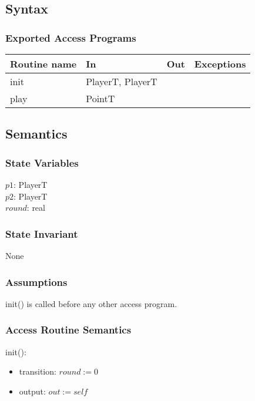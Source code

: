 \documentclass[12pt]{article}
\begin{document}
\subsection* {Syntax}

\subsubsection* {Exported Access Programs}

\begin{tabular}{| l | l | l | l |}
\hline
\textbf{Routine name} & \textbf{In} & \textbf{Out} & \textbf{Exceptions}\\
\hline
init & PlayerT, PlayerT &  & \\
\hline 
play & PointT &  &\\
\hline
\end{tabular}

\subsection* {Semantics}

\subsubsection* {State Variables}

$\mathit{p1}$: PlayerT \\
$\mathit{p2}$: PlayerT \\
$\mathit{round}$: real \\

\subsubsection* {State Invariant}
None

\subsubsection* {Assumptions}
init() is called before any other access program.

\subsubsection* {Access Routine Semantics}

\noindent init():
\begin{itemize}
\item transition: $round := 0$
\item output: $out := \mathit{self}$
\end{itemize}
\end{document}

